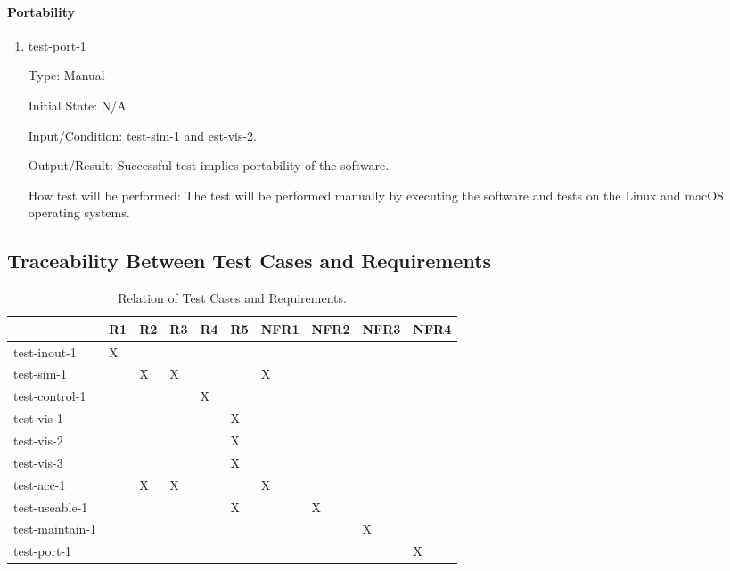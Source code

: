 \documentclass[12pt, titlepage]{article}
\begin{document}
\paragraph{Portability}

\begin{enumerate}

\item{test-port-1\\}

Type: Manual
					
Initial State: N/A
					
Input/Condition: test-sim-1 and est-vis-2. 
					
Output/Result: Successful test implies portability of the software.
					
How test will be performed: The test will be performed manually 
by executing the software and tests on the Linux and macOS operating systems.

\end{enumerate}

\subsection{Traceability Between Test Cases and Requirements}

\begin{table}[!h]
  \centering
  \caption{Relation of Test Cases and Requirements.}
  \label{tab:traceability}
  \begin{tabular}{|l|l|l|l|l|l|l|l|l|l|}
    \hline
                    & R1 & R2 & R3 & R4 & R5 & NFR1 & NFR2 & NFR3 & NFR4 \\ \hline
    test-inout-1    & X  &    &    &    &    &      &      &      &      \\ \hline
    test-sim-1      &    & X  & X  &    &    &  X   &      &      &      \\ \hline
    test-control-1  &    &    &    & X  &    &      &      &      &      \\ \hline
    test-vis-1      &    &    &    &    & X  &      &      &      &      \\ \hline
    test-vis-2      &    &    &    &    & X  &      &      &      &      \\ \hline
    test-vis-3      &    &    &    &    & X  &      &      &      &      \\ \hline
    test-acc-1      &    &  X &  X &    &    &  X   &      &      &      \\ \hline
    test-useable-1  &    &    &    &    &  X &      &  X   &      &      \\ \hline
    test-maintain-1 &    &    &    &    &    &      &      &  X   &      \\ \hline
    test-port-1     &    &    &    &    &    &      &      &      &  X   \\ \hline
  \end{tabular}
\end{table}
\end{document}
